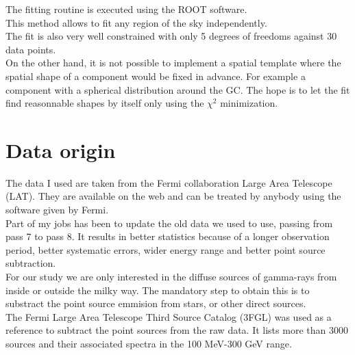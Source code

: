 The fitting routine is executed using the ROOT software. \\

This method allows to fit any region of the sky independently.\\

The fit is also very well constrained with only 5 degrees of freedoms against 30 data points.\\

On the other hand, it is not possible to implement a spatial template where the spatial shape of a component would be fixed in advance. For example a component with a spherical distribution around the GC. The hope is to let the fit find reasonnable shapes by itself only using the $\chi ^2$ minimization.\\



\section{Data origin}


The data I used are taken from the Fermi collaboration Large Area Telescope (LAT). They are available on the web and can be treated by anybody using the software given by Fermi.\\

Part of my jobs has been to update the old data we used to use, passing from pass 7 to pass 8. It results in better statistics because of a longer observation period, better systematic errors, wider energy range and better point source subtraction.\\

For our study we are only interested in the diffuse sources of gamma-rays from inside or outside the milky way. The mandatory step to obtain this is to substract the point source emmision from stars, or other direct sources.\\

The Fermi Large Area Telescope Third Source Catalog (3FGL) was used as a reference to subtract the point sources from the raw data. It lists more than 3000 sources and their associated spectra in the 100 MeV-300 GeV range.\\



